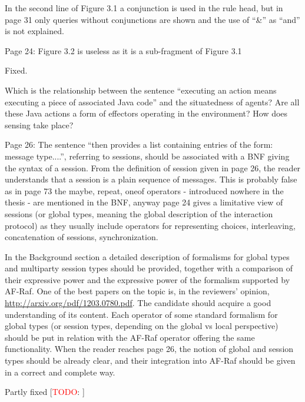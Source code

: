 \documentclass{article}
\newcommand{\todo}[1]{[\textcolor{red}{TODO}: #1]}
\newenvironment{them}{\noindent\begingroup\color{blue}}{\endgroup\par}
\begin{document}
\begin{them}

In the second line of Figure 3.1 a conjunction is used in the rule head, but in
page 31 only queries without conjunctions are shown and the use of “\&” as
“and” is not explained.

\end{them}
\todo{} 

\begin{them}

Page 24:
Figure 3.2 is useless as it is a sub-fragment of Figure 3.1
\end{them}
Fixed. 

\begin{them}

Which is the relationship between the sentence “executing an action means
executing a piece of associated Java code” and the situatedness of agents? Are
all these Java actions a form of effectors operating in the environment? How
does sensing take place?

\end{them}
\todo{explain this} 

\begin{them}

Page 26:
The sentence “then provides a list containing entries of the form: message
type....”, referring to sessions, should be associated with a BNF giving the
syntax of a session. From the definition of session given in page 26, the
reader understands that a session is a plain sequence of messages. This is
probably false as in page 73 the maybe, repeat, oneof operators - introduced
nowhere in the thesis - are mentioned in the BNF, anyway page 24 gives a
limitative view of sessions (or global types, meaning the global description of
the interaction protocol) as they usually include operators for representing
choices, interleaving, concatenation of sessions, synchronization. 

\end{them}
\todo{explain this} 

\begin{them}

In the Background section a detailed description of formalisms for global types
and multiparty session types should be provided, together with a comparison of
their expressive power and the expressive power of the formalism supported by
AF-Raf. One of the best papers on the topic is, in the reviewers' opinion,
\url{http://arxiv.org/pdf/1203.0780.pdf}. The candidate should acquire a good
understanding of its content. Each operator of some standard formalism for
global types (or session types, depending on the global vs local perspective)
should be put in relation with the AF-Raf operator offering the same
functionality. When the reader reaches page 26, the notion of global and
session types should be already clear, and their integration into AF-Raf should
be given in a correct and complete way.

\end{them}
Partly fixed
\todo{} 
\end{document}
